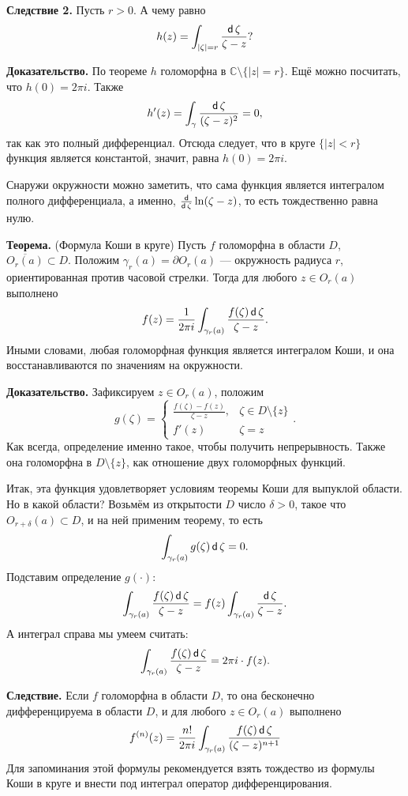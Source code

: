 \textbf{Следствие 2.} Пусть $r > 0$. А чему равно
\[
    h(z) = \int_{|\zeta| = r} \frac{\operatorname{\mathsf d} \zeta}{\zeta - z}?
\]

\textbf{Доказательство.} По теореме $h$ голоморфна в $\mathbb C \setminus \{|z| = r\}$.
Ещё можно посчитать, что $h(0) = 2\pi i$.
Также
\[
    h'(z) = \int_\gamma \frac{\operatorname{\mathsf d} \zeta}{(\zeta - z)^2} = 0,
\]
так как это полный дифференциал.
Отсюда следует, что в круге $\{|z| < r\}$ функция является константой, значит, равна $h(0) = 2\pi i$.

Снаружи окружности можно заметить, что сама функция является интегралом полного дифференциала, а именно, $\frac{\operatorname{\mathsf d}}{\operatorname{\mathsf d} \zeta} \ln(\zeta - z)$, то есть тождественно равна нулю.

\QED

\textbf{Теорема.} (Формула Коши в круге) Пусть $f$ голоморфна в области $D$, $\overline {O_r(a)} \subset D$.
Положим $\gamma_r(a) = \partial O_r(a)$ --- окружность радиуса $r$, ориентированная против часовой стрелки.
Тогда для любого $z \in O_r(a)$ выполнено
\[
    f(z) = \frac{1}{2\pi i} \int_{\gamma_r(a)} \frac{f(\zeta) \operatorname{\mathsf d} \zeta}{\zeta - z}.
\]
Иными словами, любая голоморфная функция является интегралом Коши, и она восстанавливаются по значениям на окружности.

\textbf{Доказательство.}
Зафиксируем $z \in O_r(a)$, положим
\[
    g(\zeta) = 
    \begin{cases}
        \frac{f(\zeta) - f(z)}{\zeta - z}, & \zeta \in D \setminus \{z\} \\
        f'(z) & \zeta = z
    \end{cases} .
\]
Как всегда, определение именно такое, чтобы получить непрерывность.
Также она голоморфна в $D \setminus \{z\}$, как отношение двух голоморфных функций.

Итак, эта функция удовлетворяет условиям теоремы Коши для выпуклой области.
Но в какой области? Возьмём из открытости $D$ число $\delta > 0$, такое что $O_{r + \delta}(a) \subset D$, и на ней применим теорему, то есть
\[
    \int_{\gamma_r(a)} g(\zeta) \operatorname{\mathsf d} \zeta = 0.
\]
Подставим определение $g(\cdot)$:
\[
    \int_{\gamma_r(a)} \frac{f(\zeta) \operatorname{\mathsf d} \zeta}{\zeta - z} = f(z) \int_{\gamma_r(a)} \frac{\operatorname{\mathsf d} \zeta}{\zeta - z}.
\]
А интеграл справа мы умеем считать:
\[
    \int_{\gamma_r(a)} \frac{f(\zeta) \operatorname{\mathsf d} \zeta}{\zeta - z} = 2\pi i \cdot f(z).
\]

\QED

\textbf{Следствие.} Если $f$ голоморфна в области $D$, то она бесконечно дифференцируема в области $D$, и для любого $z \in O_r(a)$ выполнено
\[
    f^{(n)}(z) = \frac{n!}{2\pi i} \int_{\gamma_r(a)} \frac{f(\zeta) \operatorname{\mathsf d} \zeta}{(\zeta - z)^{n+1}}
\]
Для запоминания этой формулы рекомендуется взять тождество из формулы Коши в круге и внести под интеграл оператор дифференцирования.

